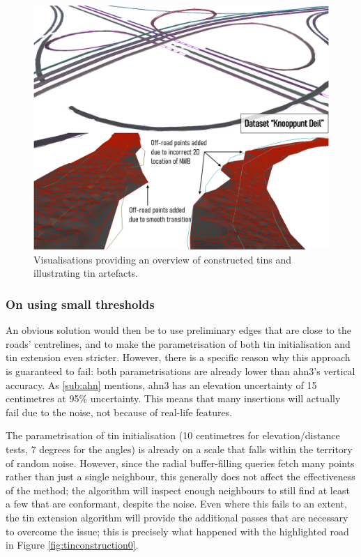 \begin{figure}[h]
    \centering
    \includegraphics[width=0.9\linewidth]{final_report/figs/tinconstruction1.png}
    \caption{Visualisations providing an overview of constructed \ac{tin}s and illustrating \ac{tin} artefacts.}
    \label{fig:tinconstruction1}
\end{figure}

\subsubsection{On using small thresholds}

An obvious solution would then be to use preliminary edges that are close to the roads' centrelines, and to make the parametrisation of both \ac{tin} initialisation and \ac{tin} extension even stricter. However, there is a specific reason why this approach is guaranteed to fail: both parametrisations are already lower than \ac{ahn3}'s vertical accuracy. As \ref{sub:ahn} mentions, \ac{ahn3} has an elevation uncertainty of 15 centimetres at 95\% uncertainty. This means that many insertions will actually fail due to the noise, not because of real-life features.

The parametrisation of \ac{tin} initialisation (10 centimetres for elevation/distance tests, 7 degrees for the angles) is already on a scale that falls within the territory of random noise. However, since the radial buffer-filling queries fetch many points rather than just a single neighbour, this generally does not affect the effectiveness of the method; the algorithm will inspect enough neighbours to still find at least a few that are conformant, despite the noise. Even where this fails to an extent, the \ac{tin} extension algorithm will provide the additional passes that are necessary to overcome the issue; this is precisely what happened with the highlighted road in Figure \ref{fig:tinconstruction0}.

